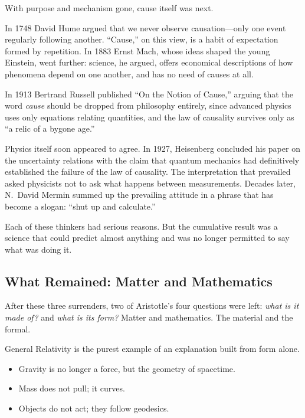 \documentclass[11pt,a4paper]{article}
\begin{document}
With purpose and mechanism gone, cause itself was next.

In 1748 David Hume argued that we never observe causation---only one event regularly following another. ``Cause,'' on this view, is a habit of expectation formed by repetition. In 1883 Ernst Mach, whose ideas shaped the young Einstein, went further: science, he argued, offers economical descriptions of how phenomena depend on one another, and has no need of causes at all.

In 1913 Bertrand Russell published ``On the Notion of Cause,'' arguing that the word \emph{cause} should be dropped from philosophy entirely, since advanced physics uses only equations relating quantities, and the law of causality survives only as ``a relic of a bygone age.''

Physics itself soon appeared to agree. In 1927, Heisenberg concluded his paper on the uncertainty relations with the claim that quantum mechanics had definitively established the failure of the law of causality. The interpretation that prevailed asked physicists not to ask what happens between measurements. Decades later, N.~David Mermin summed up the prevailing attitude in a phrase that has become a slogan: ``shut up and calculate.''

Each of these thinkers had serious reasons. But the cumulative result was a science that could predict almost anything and was no longer permitted to say what was doing it.

\subsection{What Remained: Matter and Mathematics}

After these three surrenders, two of Aristotle's four questions were left: \emph{what is it made of?} and \emph{what is its form?} Matter and mathematics. The material and the formal.

General Relativity is the purest example of an explanation built from form alone.

\begin{itemize}
  \item Gravity is no longer a force, but the geometry of spacetime.
  \item Mass does not pull; it curves.
  \item Objects do not act; they follow geodesics.
\end{itemize}
\end{document}
